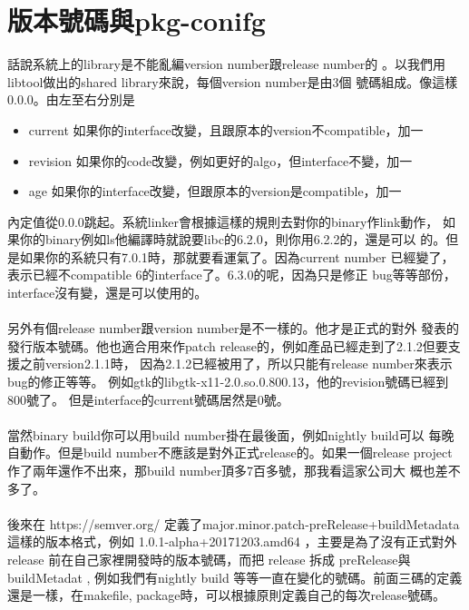 \section{版本號碼與pkg-conifg}
  話說系統上的library是不能亂編version number跟release number的
  。以我們用libtool做出的shared library來說，每個version number是由3個
  號碼組成。像這樣 0.0.0。由左至右分別是
  \begin{itemize} 
    \item current  如果你的interface改變，且跟原本的version不compatible，加一
    \item revision 如果你的code改變，例如更好的algo，但interface不變，加一
    \item age      如果你的interface改變，但跟原本的version是compatible，加一
  \end{itemize}
  內定值從0.0.0跳起。系統linker會根據這樣的規則去對你的binary作link動作，
  如果你的binary例如ls他編譯時就說要libc的6.2.0，則你用6.2.2的，還是可以
  的。但是如果你的系統只有7.0.1時，那就要看運氣了。因為current number
  已經變了，表示已經不compatible 6的interface了。6.3.0的呢，因為只是修正
  bug等等部份，interface沒有變，還是可以使用的。
  \\\\
  另外有個release number跟version number是不一樣的。他才是正式的對外
  發表的發行版本號碼。他也適合用來作patch
  release的，例如產品已經走到了2.1.2但要支援之前version2.1.1時，
  因為2.1.2已經被用了，所以只能有release number來表示bug的修正等等。
  例如gtk的libgtk-x11-2.0.so.0.800.13，他的revision號碼已經到800號了。
  但是interface的current號碼居然是0號。
  \\\\
  當然binary build你可以用build number掛在最後面，例如nightly build可以
  每晚自動作。但是build number不應該是對外正式release的。如果一個release
  project作了兩年還作不出來，那build number頂多7百多號，那我看這家公司大
  概也差不多了。
  \\\\
  後來在 https://semver.org/ 定義了major.minor.patch-preRelease+buildMetadata
  這樣的版本格式，例如 1.0.1-alpha+20171203.amd64 ，主要是為了沒有正式對外
  release 前在自己家裡開發時的版本號碼，而把 release 拆成 preRelease與
  buildMetadat , 例如我們有nightly build 等等一直在變化的號碼。前面三碼的定義
  還是一樣，在makefile, package時，可以根據原則定義自己的每次release號碼。

